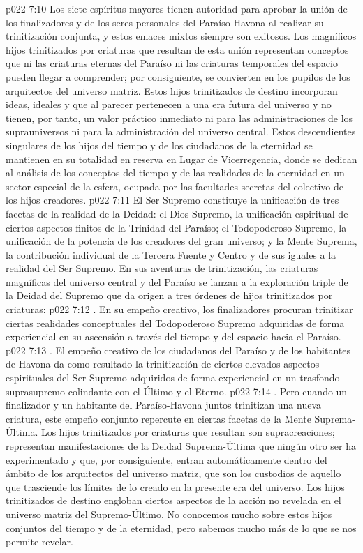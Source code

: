 \vs p022 7:10 \pc Los siete espíritus mayores tienen autoridad para aprobar la unión de los finalizadores y de los seres personales del Paraíso\hyp{}Havona al realizar su trinitización conjunta, y estos enlaces mixtos siempre son exitosos. Los magníficos hijos trinitizados por criaturas que resultan de esta unión representan conceptos que ni las criaturas eternas del Paraíso ni las criaturas temporales del espacio pueden llegar a comprender; por consiguiente, se convierten en los pupilos de los arquitectos del universo matriz. Estos hijos trinitizados de destino incorporan ideas, ideales y  que al parecer pertenecen a una era futura del universo y no tienen, por tanto, un valor práctico inmediato ni para las administraciones de los suprauniversos ni para la administración del universo central. Estos descendientes singulares de los hijos del tiempo y de los ciudadanos de la eternidad se mantienen en su totalidad en reserva en Lugar de Vicerregencia, donde se dedican al análisis de los conceptos del tiempo y de las realidades de la eternidad en un sector especial de la esfera, ocupada por las facultades secretas del colectivo de los hijos creadores.
\vs p022 7:11 \pc El Ser Supremo constituye la unificación de tres facetas de la realidad de la Deidad: el Dios Supremo, la unificación espiritual de ciertos aspectos finitos de la Trinidad del Paraíso; el Todopoderoso Supremo, la unificación de la potencia de los creadores del gran universo; y la Mente Suprema, la contribución individual de la Tercera Fuente y Centro y de sus iguales a la realidad del Ser Supremo. En sus aventuras de trinitización, las criaturas magníficas del universo central y del Paraíso se lanzan a la exploración triple de la Deidad del Supremo que da origen a tres órdenes de hijos trinitizados por criaturas:
\vs p022 7:12 . En su empeño creativo, los finalizadores procuran trinitizar ciertas realidades conceptuales del Todopoderoso Supremo adquiridas de forma experiencial en su ascensión a través del tiempo y del espacio hacia el Paraíso.
\vs p022 7:13 . El empeño creativo de los ciudadanos del Paraíso y de los habitantes de Havona da como resultado la trinitización de ciertos elevados aspectos espirituales del Ser Supremo adquiridos de forma experiencial en un trasfondo suprasupremo colindante con el Último y el Eterno.
\vs p022 7:14 . Pero cuando un finalizador y un habitante del Paraíso\hyp{}Havona juntos trinitizan una nueva criatura, este empeño conjunto repercute en ciertas facetas de la Mente Suprema\hyp{}Última. Los hijos trinitizados por criaturas que resultan son supracreaciones; representan manifestaciones de la Deidad Suprema\hyp{}Última que ningún otro ser ha experimentado y que, por consiguiente, entran automáticamente dentro del ámbito de los arquitectos del universo matriz, que son los custodios de aquello que trasciende los límites de lo creado en la presente era del universo. Los hijos trinitizados de destino engloban ciertos aspectos de la acción no revelada en el universo matriz del Supremo\hyp{}Último. No conocemos mucho sobre estos hijos conjuntos del tiempo y de la eternidad, pero sabemos mucho más de lo que se nos permite revelar.
